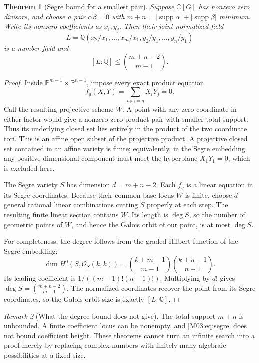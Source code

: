 \documentclass[11pt,a4paper,oneside]{report}
\newtheorem{theorem}{Theorem}[section]
\theoremstyle{definition}
\theoremstyle{remark}
\newtheorem{remark}[theorem]{Remark}
\DeclareMathOperator{\supp}{supp}
\newcommand{\C}{\mathbb C}
\newcommand{\Q}{\mathbb Q}
\newcommand{\PP}{\mathbb P}
\newcommand{\OO}{\mathcal O}
\begin{document}
\begin{theorem}[Segre bound for a smallest pair]\label{M03:thm:segre}
Suppose \(\C[G]\) has nonzero zero divisors, and choose a pair \(\alpha\beta=0\) with \(m+n=|\supp\alpha|+|\supp\beta|\) minimum. Write its nonzero coefficients as \(x_i,y_j\). Then their joint normalized field
\[
L=\Q(x_2/x_1,\ldots,x_m/x_1,y_2/y_1,\ldots,y_n/y_1)
\]
is a number field and
\begin{equation}\label{M03:eq:segre}
\boxed{[L:\Q]\le\binom{m+n-2}{m-1}.}
\end{equation}
\end{theorem}
\begin{proof}
Inside \(\PP^{m-1}\times\PP^{n-1}\), impose every exact product equation
\[
f_g(X,Y)=\sum_{a_i b_j=g}X_iY_j=0.
\]
Call the resulting projective scheme \(W\). A point with any zero coordinate in either factor would give a nonzero zero-product pair with smaller total support. Thus its underlying closed set lies entirely in the product of the two coordinate tori. This is an affine open subset of the projective product. A projective closed set contained in an affine variety is finite; equivalently, in the Segre embedding any positive-dimensional component must meet the hyperplane \(X_1Y_1=0\), which is excluded here.

The Segre variety \(S\) has dimension \(d=m+n-2\). Each \(f_g\) is a linear equation in its Segre coordinates. Because their common base locus \(W\) is finite, choose \(d\) general rational linear combinations cutting \(S\) properly at each step. The resulting finite linear section contains \(W\). Its length is \(\deg S\), so the number of geometric points of \(W\), and hence the Galois orbit of our point, is at most \(\deg S\).

For completeness, the degree follows from the graded Hilbert function of the Segre embedding:
\[
\dim H^0(S,\OO_S(k,k))
=\binom{k+m-1}{m-1}\binom{k+n-1}{n-1}.
\]
Its leading coefficient is \(1/((m-1)!(n-1)!)\). Multiplying by \(d!\) gives \(\deg S=\binom{m+n-2}{m-1}\). The normalized coordinates recover the point from its Segre coordinates, so the Galois orbit size is exactly \([L:\Q]\).
\end{proof}

\begin{remark}[What the degree bound does not give]
The total support \(m+n\) is unbounded. A finite coefficient locus can be nonempty, and \eqref{M03:eq:segre} does not bound coefficient height. These theorems cannot turn an infinite search into a proof merely by replacing complex numbers with finitely many algebraic possibilities at a fixed size.
\end{remark}
\end{document}
